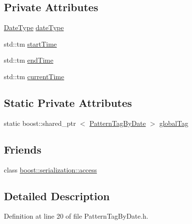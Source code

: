 \subsection*{\-Private \-Attributes}
\begin{DoxyCompactItemize}
\item 
\hyperlink{classcryomesh_1_1state_1_1PatternTagByDate_a0fe44df3214c9397e04ff9a4e8c57ad9}{\-Date\-Type} \hyperlink{classcryomesh_1_1state_1_1PatternTagByDate_a978cee17d8215fcf90a050a033cab7ec}{date\-Type}
\item 
std\-::tm \hyperlink{classcryomesh_1_1state_1_1PatternTagByDate_afe5398940c00ed0fd3b70dcb52efea1c}{start\-Time}
\item 
std\-::tm \hyperlink{classcryomesh_1_1state_1_1PatternTagByDate_a7d1640030846523333a228078cd72acc}{end\-Time}
\item 
std\-::tm \hyperlink{classcryomesh_1_1state_1_1PatternTagByDate_ad80a0a36ec25f13a65c8beadc349c58c}{current\-Time}
\end{DoxyCompactItemize}
\subsection*{\-Static \-Private \-Attributes}
\begin{DoxyCompactItemize}
\item 
static boost\-::shared\-\_\-ptr\*
$<$ \hyperlink{classcryomesh_1_1state_1_1PatternTagByDate}{\-Pattern\-Tag\-By\-Date} $>$ \hyperlink{classcryomesh_1_1state_1_1PatternTagByDate_ac1d93cdd406b287fd3a008102e1d046c}{global\-Tag}
\end{DoxyCompactItemize}
\subsection*{\-Friends}
\begin{DoxyCompactItemize}
\item 
class \hyperlink{classcryomesh_1_1state_1_1PatternTagByDate_ac98d07dd8f7b70e16ccb9a01abf56b9c}{boost\-::serialization\-::access}
\end{DoxyCompactItemize}


\subsection{\-Detailed \-Description}


\-Definition at line 20 of file \-Pattern\-Tag\-By\-Date.\-h.



